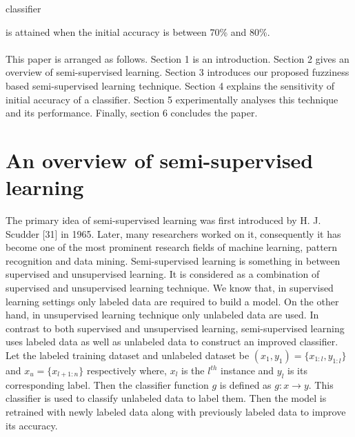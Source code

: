 \documentclass{article}
\begin{document}
	classifier
	
	
	\vspace{10em}
	\hspace{0.3cm}is attained when the initial accuracy is between 70\% and 80\%.\\\\
	This paper is arranged as follows. Section 1 is an introduction. Section 2 gives an overview of semi-supervised learning. Section 3 introduces our proposed fuzziness based semi-supervised learning technique.
	Section 4 explains the sensitivity of initial accuracy of a classifier. Section 5 experimentally analyses this
	technique and its performance. Finally, section 6 concludes the paper.
	
	
	
	\section{An overview of semi-supervised learning}
	\hspace{0.3cm}The primary idea of semi-supervised learning was first introduced by H. J. Scudder [31] \cite{kordi2012effects, worrall1999public, alam2006removing} in 1965. Later,
	many researchers worked on it, consequently it has become one of the most prominent research fields of
	machine learning, pattern recognition and data mining. Semi-supervised learning is something in between
	supervised and unsupervised learning. It is considered as a combination of supervised and unsupervised
	learning technique. We know that, in supervised learning settings only labeled data are required to build a
	model. On the other hand, in unsupervised learning technique only unlabeled data are used. In contrast to
	both supervised and unsupervised learning, semi-supervised learning uses labeled data as well as unlabeled data to construct an improved classifier.\\
	
	\hspace{0.3cm}Let the labeled training dataset and unlabeled dataset be $(x_1, y_1) = \{x_{1:l}, y_{1:l} \}$ and $x_u = \{x_{l+1 : n}\}$ respectively where, $ x_l$
	is the $l^{th}$ instance and $y_l$
	is its corresponding label. Then the classifier function $g$ is defined
	as $g : x \rightarrow y$. This classifier is used to classify unlabeled data to label them. Then the model is retrained
	with newly labeled data along with previously labeled data to improve its accuracy.\\
	
	\vspace{1em}
	
\end{document}
